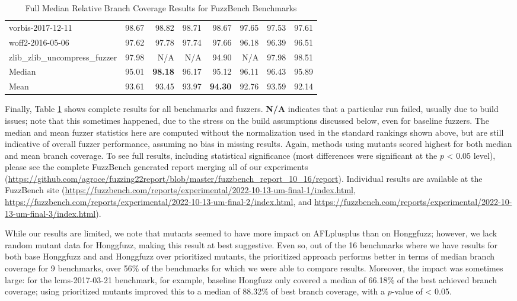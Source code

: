 \begin{table}
{\begin{tabular}{l|r|r|r|r|r|r|r}
vorbis-2017-12-11 & 98.67 & 98.82 & 98.71 & 98.67 & 97.65 & 97.53 & 97.61 \\
woff2-2016-05-06 & 97.62 & 97.78 & 97.74 & 97.66 & 96.18 & 96.39 & 96.51 \\
        zlib\_zlib\_uncompress\_fuzzer & 97.98 & N/A & N/A & 94.90 & N/A & 97.98 & 98.51 \\
        \hline
Median & 95.01 & {\bf 98.18} & 96.17 & 95.12 & 96.11 & 96.43 & 95.89 \\
Mean & 93.61 & 93.45 & 93.97 & {\bf 94.30} & 92.76 & 93.59 & 92.14 \\
      \end{tabular}
      }
      \caption{Full Median Relative Branch Coverage Results for FuzzBench Benchmarks}
      \label{tab:fullfuzzbench}
    \end{table}

    Finally, Table \ref{tab:fullfuzzbench} shows complete results for all benchmarks and fuzzers.  {\bf N/A} indicates that a particular run failed, usually due to build issues; note that this sometimes happened, due to the stress on the build assumptions discussed below, even for baseline fuzzers.  The median and mean fuzzer statistics here are computed without the normalization used in the standard rankings shown above, but are still indicative of overall fuzzer performance, assuming no bias in missing results.  Again, methods using mutants scored highest for both median and mean branch coverage.  To see full results, including statistical significance (most differences were significant at the $p$ < 0.05 level), please see the complete FuzzBench generated report merging all of our experiments (\url{https://github.com/agroce/fuzzing22report/blob/master/fuzzbench_report_10_16/report}).  Individual results are available at the FuzzBench site (\url{https://fuzzbench.com/reports/experimental/2022-10-13-um-final-1/index.html}, \url{https://fuzzbench.com/reports/experimental/2022-10-13-um-final-2/index.html}, and \url{https://fuzzbench.com/reports/experimental/2022-10-13-um-final-3/index.html}).

    While our results are limited, we note that mutants seemed to have more impact on AFLplusplus than on Honggfuzz; however, we lack random mutant data for Honggfuzz, making this result at best suggestive.  Even so, out of  the 16 benchmarks where we have results for both base Honggfuzz and and Honggfuzz over prioritized mutants, the prioritized approach performs better in terms of median branch coverage for 9 benchmarks, over 56\% of the benchmarks for which we were able to compare results.  Moreover, the impact was sometimes large:  for the lcms-2017-03-21 benchmark, for example, baseline Hongfuzz only covered a median of 66.18\% of the best achieved branch coverage; using prioritized mutants improved this to a median of 88.32\% of best branch coverage, with a $p$-value of < 0.05.

